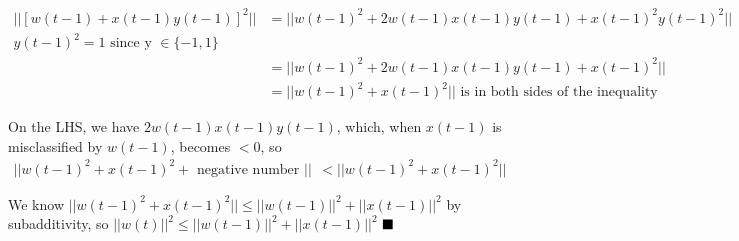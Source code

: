 \documentclass{article}
\begin{document}
\begin{enumerate}
\begin{enumerate}[label=(\alph*)]
            \begin{align*}
                ||[w(t-1) + x(t-1)y(t-1)]^2|| &= ||w(t-1)^2 + 2w(t-1)x(t-1)y(t-1) + x(t-1)^2y(t-1)^2||\\
                y(t-1)^2 = 1 \text{ since y } \in\{-1, 1\}\\
                &=||w(t-1)^2 + 2w(t-1)x(t-1)y(t-1) + x(t-1)^2||\\
                &=||w(t-1)^2+x(t-1)^2|| \text{ is in both sides of the inequality}
            \end{align*}

            On the LHS, we have $2w(t-1)x(t-1)y(t-1)$, which, when $x(t-1)$ is misclassified by $w(t-1)$, becomes $<0$, so
            \begin{align*}
                ||w(t-1)^2 + x(t-1)^2 + \text{ negative number }|| &<||w(t-1)^2+x(t-1)^2||
            \end{align*}

            We know $||w(t-1)^2 + x(t-1)^2|| \leq ||w(t-1)||^2 + ||x(t-1)||^2$ by subadditivity, so $||w(t)||^2 \leq ||w(t-1)||^2 + ||x(t-1)||^2$ $\hfill \blacksquare$
        \end{enumerate}
    \end{enumerate}
\end{document}
